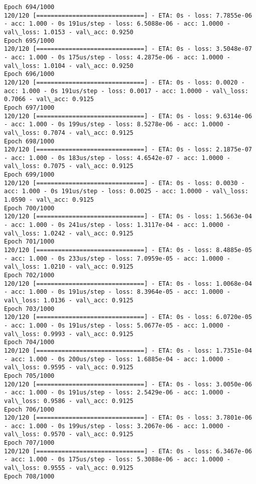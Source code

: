 \documentclass[11pt]{article}
\begin{document}
\begin{Verbatim}[commandchars=\\\{\}]
Epoch 694/1000
120/120 [==============================] - ETA: 0s - loss: 7.7855e-06 - acc: 1.000 - 0s 191us/step - loss: 6.5088e-06 - acc: 1.0000 - val\_loss: 1.0153 - val\_acc: 0.9250
Epoch 695/1000
120/120 [==============================] - ETA: 0s - loss: 3.5048e-07 - acc: 1.000 - 0s 175us/step - loss: 4.2875e-06 - acc: 1.0000 - val\_loss: 1.0104 - val\_acc: 0.9250
Epoch 696/1000
120/120 [==============================] - ETA: 0s - loss: 0.0020 - acc: 1.000 - 0s 191us/step - loss: 0.0017 - acc: 1.0000 - val\_loss: 0.7066 - val\_acc: 0.9125
Epoch 697/1000
120/120 [==============================] - ETA: 0s - loss: 9.6314e-06 - acc: 1.000 - 0s 199us/step - loss: 8.5278e-06 - acc: 1.0000 - val\_loss: 0.7074 - val\_acc: 0.9125
Epoch 698/1000
120/120 [==============================] - ETA: 0s - loss: 2.1875e-07 - acc: 1.000 - 0s 183us/step - loss: 4.6542e-07 - acc: 1.0000 - val\_loss: 0.7075 - val\_acc: 0.9125
Epoch 699/1000
120/120 [==============================] - ETA: 0s - loss: 0.0030 - acc: 1.000 - 0s 191us/step - loss: 0.0025 - acc: 1.0000 - val\_loss: 1.0590 - val\_acc: 0.9125
Epoch 700/1000
120/120 [==============================] - ETA: 0s - loss: 1.5663e-04 - acc: 1.000 - 0s 241us/step - loss: 1.3117e-04 - acc: 1.0000 - val\_loss: 1.0242 - val\_acc: 0.9125
Epoch 701/1000
120/120 [==============================] - ETA: 0s - loss: 8.4885e-05 - acc: 1.000 - 0s 233us/step - loss: 7.0959e-05 - acc: 1.0000 - val\_loss: 1.0210 - val\_acc: 0.9125
Epoch 702/1000
120/120 [==============================] - ETA: 0s - loss: 1.0068e-04 - acc: 1.000 - 0s 191us/step - loss: 8.3964e-05 - acc: 1.0000 - val\_loss: 1.0136 - val\_acc: 0.9125
Epoch 703/1000
120/120 [==============================] - ETA: 0s - loss: 6.0720e-05 - acc: 1.000 - 0s 191us/step - loss: 5.0677e-05 - acc: 1.0000 - val\_loss: 0.9993 - val\_acc: 0.9125
Epoch 704/1000
120/120 [==============================] - ETA: 0s - loss: 1.7351e-04 - acc: 1.000 - 0s 200us/step - loss: 1.6885e-04 - acc: 1.0000 - val\_loss: 0.9595 - val\_acc: 0.9125
Epoch 705/1000
120/120 [==============================] - ETA: 0s - loss: 3.0050e-06 - acc: 1.000 - 0s 191us/step - loss: 2.5429e-06 - acc: 1.0000 - val\_loss: 0.9586 - val\_acc: 0.9125
Epoch 706/1000
120/120 [==============================] - ETA: 0s - loss: 3.7801e-06 - acc: 1.000 - 0s 199us/step - loss: 3.2067e-06 - acc: 1.0000 - val\_loss: 0.9570 - val\_acc: 0.9125
Epoch 707/1000
120/120 [==============================] - ETA: 0s - loss: 6.3467e-06 - acc: 1.000 - 0s 175us/step - loss: 5.3088e-06 - acc: 1.0000 - val\_loss: 0.9555 - val\_acc: 0.9125
Epoch 708/1000

\end{Verbatim}
\end{document}

